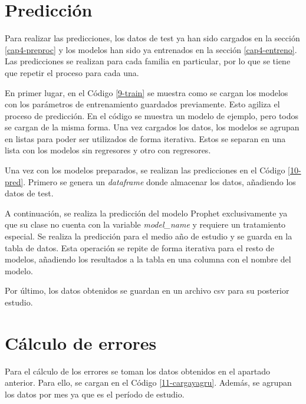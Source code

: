 

\section{Predicción}

Para realizar las predicciones, los datos de test ya han sido cargados en la sección \ref{cap4-preproc} y los modelos han sido ya entrenados en la sección \ref{cap4-entreno}. Las predicciones se realizan para cada familia en particular, por lo que se tiene que repetir el proceso para cada una.

En primer lugar, en el Código \ref{9-train} se muestra como se cargan los modelos con los parámetros de entrenamiento guardados previamente. Esto agiliza el proceso de predicción. En el código se muestra un modelo de ejemplo, pero todos se cargan de la misma forma. Una vez cargados los datos, los modelos se agrupan en listas para poder ser utilizados de forma iterativa. Estos se separan en una lista con los modelos sin regresores y otro con regresores.



Una vez con los modelos preparados, se realizan las predicciones en el Código \ref{10-pred}. Primero se genera un \textit{dataframe} donde almacenar los datos, añadiendo los datos de test.

A continuación, se realiza la predicción del modelo Prophet exclusivamente ya que su clase no cuenta con la variable \textit{model\_name} y requiere un tratamiento especial. Se realiza la predicción para el medio año de estudio y se guarda en la tabla de datos. Esta operación se repite de forma iterativa para el resto de modelos, añadiendo los resultados a la tabla en una columna con el nombre del modelo.

Por último, los datos obtenidos se guardan en un archivo csv para su posterior estudio.



\section{Cálculo de errores}

Para el cálculo de los errores se toman los datos obtenidos en el apartado anterior. Para ello, se cargan en el Código \ref*{11-cargayagru}. Además, se agrupan los datos por mes ya que es el período de estudio.

